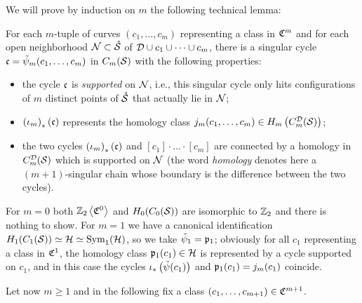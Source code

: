 We will prove by induction on $m$ the following technical lemma:

\begin{lem}
 \label{lem:tpsiwithproperties}
For each $m$-tuple of curves $(c_1,\dots,c_m)$ representing a class in $\cC^m$
and for each open neighborhood $\N\subset\mrS$ of
$\D\cup c_1\cup\dots\cup c_m$, there is a singular cycle $\fc=\tpsi_m(c_1,\dots,c_m)$
in $\cms$ with the following properties:
\begin{itemize}
 \item the cycle $\fc$ is \emph{supported} on $\N$, i.e.,
this singular cycle only hits configurations of $m$ distinct points of $\mrS$ that actually lie in $\N$;
\item $\pa{\iota_m}_*(\fc)$ represents the homology class $\j_m(c_1,\dots,c_m)\in H_m\pa{\cmsD}$;
\item the two cycles $\pa{\iota_m}_*(\fc)$ and $[c_1]\cdot\ldots\cdot[c_m]$
are connected by a homology in $\cmsD$ which is supported on $\N$ (the word
\emph{homology} denotes here a $(m+1)$-singular chain whose boundary is the difference between the two cycles).
\end{itemize}
\end{lem}

For $m=0$ both $\ZcC{0}$ and $H_0(C_0(\S))$ are
isomorphic to $\Z_2$ and there is nothing to show. For $m=1$
we have a canonical identification $H_1(C_1(\S))\simeq\H\simeq\Sym_1(\H)$, so we take $\tpsi_1=\pr_1$;
obviously for all $c_1$ representing a class in $\cC^1$, the homology class $\pr_1(c_1)\in\H$
is represented by a cycle supported on $c_1$,
and in this case the cycles $\iota_*\pa{\tpsi(c_1)}$ and $\pr_1(c_1)=\j_m(c_1)$ coincide.

Let now $m\geq 1$ and in the following fix a class $(c_1,\dots, c_{m+1})\in\cC^{m+1}$.

